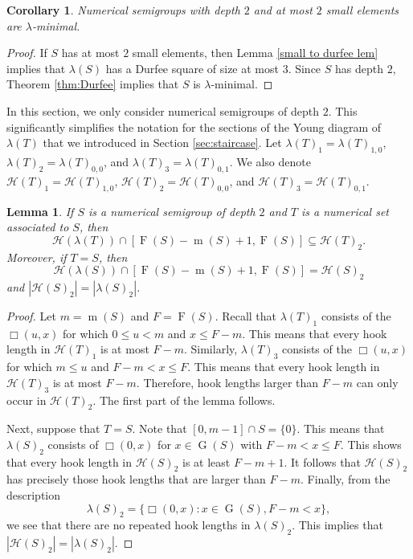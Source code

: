\documentclass{amsproc}
\DeclareMathOperator{\F}{F}
\DeclareMathOperator{\G}{G}
\DeclareMathOperator{\m}{m}
\newtheorem{lemma}[theorem]{Lemma}
\newtheorem{corollary}[theorem]{Corollary}
\theoremstyle{definition}
\theoremstyle{remark}
\numberwithin{equation}{section}
\begin{document}
\begin{corollary}
    Numerical semigroups with depth $2$ and at most $2$ small elements are $\lambda$-minimal.
\end{corollary}

\begin{proof}
    If $S$ has at most $2$ small elements, then Lemma \ref{small to durfee lem} implies that $\lambda(S)$ has a Durfee square of size at most $3$. Since $S$ has depth $2$, Theorem \ref{thm:Durfee} implies that $S$ is $\lambda$-minimal.
\end{proof}

In this section, we only consider numerical semigroups of depth $2$. This significantly simplifies the notation for the sections of the Young diagram of $\lambda(T)$ that we introduced in Section \ref{sec:staircase}. Let $\lambda(T)_{1}=\lambda(T)_{1,0}$, $\lambda(T)_{2}=\lambda(T)_{0,0}$, and $\lambda(T)_{3}=\lambda(T)_{0,1}$.
We also denote $\mathcal{H}(T)_{1}=\mathcal{H}(T)_{1,0}$, $\mathcal{H}(T)_{2}=\mathcal{H}(T)_{0,0}$, and $\mathcal{H}(T)_{3}=\mathcal{H}(T)_{0,1}$.


\begin{lemma}\label{lem: section 2}
If $S$ is a numerical semigroup of depth $2$ and $T$ is a numerical set associated to $S$, then
\[
\mathcal{H}(\lambda(T))\cap [\F(S)-\m(S)+1,\F(S)]\subseteq \mathcal{H}(T)_2.
\]
Moreover, if $T=S$, then
\[
\mathcal{H}(\lambda(S))\cap [\F(S)-\m(S)+1,\F(S)]= \mathcal{H}(S)_2
\]
and $|\mathcal{H}(S)_2|=|\lambda(S)_2|$.
\end{lemma}
\begin{proof}
Let $m=\m(S)$ and $F=\F(S)$.
Recall that $\lambda(T)_{1}$ consists of the $\Box(u,x)$ for which $0\leq u<m$ and $x\leq F-m$. This means that every hook length in $\mathcal{H}(T)_1$ is at most $F-m$.
Similarly, $\lambda(T)_{3}$ consists of the $\Box(u,x)$ for which $m\leq u$ and $F-m<x\leq F$. This means that every hook length in $\mathcal{H}(T)_3$ is at most $F-m$.
Therefore, hook lengths larger than $F-m$ can only occur in $\mathcal{H}(T)_{2}$. The first part of the lemma follows.

Next, suppose that $T=S$. Note that $[0,m-1]\cap S=\{0\}$. This means that $\lambda(S)_2$ consists of $\Box(0,x)$ for $x\in \G(S)$ with $F-m<x\leq F$. This shows that every hook length in $\mathcal{H}(S)_2$ is at least $F-m+1$. It follows that $\mathcal{H}(S)_{2}$ has precisely those hook lengths that are larger than $F-m$.
Finally, from the description 
\[
\lambda(S)_2=\{\Box(0,x): x\in \G(S), F-m<x\},
\]
we see that there are no repeated hook lengths in $\lambda(S)_2$. This implies that $|\mathcal{H}(S)_2|=|\lambda(S)_2|$.
\end{proof}
\end{document}
